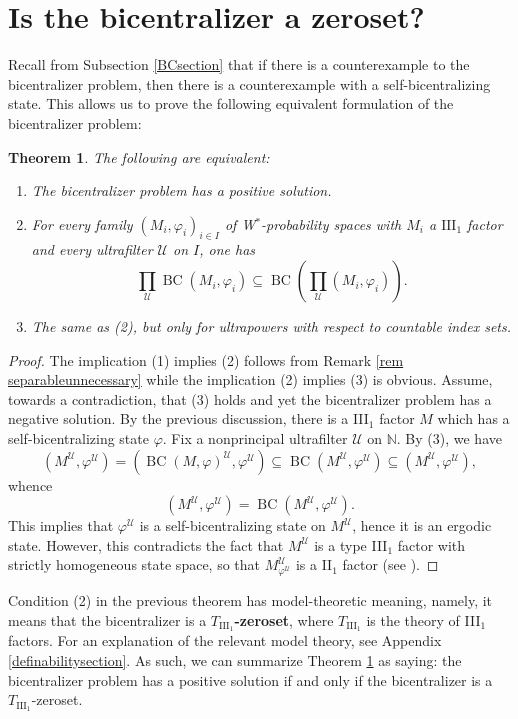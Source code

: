 \documentclass[12pt]{amsart}
\newtheorem{thm}{Theorem}[section]
\theoremstyle{definition}
\newcommand{\N}{\mathbb{N}}
\def\u{\mathsf 1}
\def \u{\mathcal U}
\def\BC{\operatorname{BC}}
\begin{document}
\section{Is the bicentralizer a zeroset?}\label{sec BCP and zeroset}

Recall from Subsection \ref{BCsection} that if there is a counterexample to the bicentralizer problem, then there is a counterexample with a self-bicentralizing state.  This allows us to prove the following equivalent formulation of the bicentralizer problem:

\begin{thm}\label{prop zero iff trivialBC}
    The following are equivalent: 
    \begin{enumerate}
        \item The bicentralizer problem has a positive solution. 
        \item For every family $(M_i,\varphi_i)_{i\in I}$ of W$^*$-probability spaces with $M_i$ a $\mathrm{III}_1$ factor and every ultrafilter $\u$ on $I$, one has 
        $$\prod_\u \BC(M_i,\varphi_i)\subseteq \BC\left(\prod_\u (M_i,\varphi_i)\right).$$
        \item The same as (2), but only for ultra\emph{powers} with respect to countable index sets.
    \end{enumerate}
\end{thm}
\begin{proof}
    The implication (1) implies (2) follows from Remark \ref{rem separableunnecessary} while the implication (2) implies (3) is obvious. Assume, towards a contradiction, that (3) holds and yet the bicentralizer problem has a negative solution.  By the previous discussion, there is a III$_1$ factor $M$ which has a self-bicentralizing state $\varphi$. Fix a nonprincipal ultrafilter $\u$ on $\N$. By (3), we have 
    \[(M^{\u},\varphi^{\u})=(\BC(M,\varphi)^{\u},\varphi^{\u})\subseteq \BC(M^{\u},\varphi^{\u})\subseteq (M^{\u},\varphi^{\u}),\]
    whence 
    \[(M^{\u},\varphi^{\u})=\BC(M^{\u},\varphi^{\u}).\]
    This implies that $\varphi^{\u}$ is a self-bicentralizing state on $M^{\u}$, hence it is an ergodic state. However, this contradicts the fact that $M^{\u}$ is a type III$_1$ factor with strictly homogeneous state space, so that  $M^{\u}_{\varphi^{\u}}$ is a II$_1$ factor (see \cite[Proposition 4.24]{AH14}). 
\end{proof}

Condition (2) in the previous theorem has model-theoretic meaning, namely, it means that the bicentralizer is a \textbf{$T_{\mathrm{III}_1}$-zeroset}, where $T_{\mathrm{III}_1}$ is the theory of III$_1$ factors.  For an explanation of the relevant model theory, see Appendix \ref{definabilitysection}.  As such, we can summarize Theorem \ref{prop zero iff trivialBC} as saying:  the bicentralizer problem has a positive solution if and only if the bicentralizer is a $T_{\mathrm{III}_1}$-zeroset.
\end{document}
